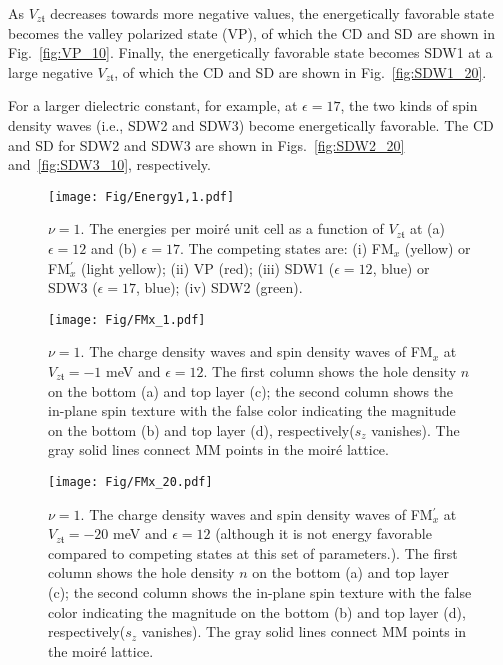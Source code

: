\documentclass[aps,prl,onecolumn,superscriptaddress,longbibliography]{revtex4-2}
\begin{document}

As $V_{z\mathfrak{t}}$ decreases towards more negative values, the energetically favorable state becomes the valley polarized state (VP), of which the CD and SD are shown in Fig.~\ref{fig:VP_10}. Finally, the energetically favorable state becomes SDW1  at a large negative $V_{z\mathfrak{t}}$, of which the CD and SD are shown in Fig.~\ref{fig:SDW1_20}. 

For a larger dielectric constant, for example, at $\epsilon=17$, the two kinds of spin density waves (i.e., SDW2 and SDW3) become energetically favorable. The CD and SD for SDW2 and SDW3 are shown in Figs.~\ref{fig:SDW2_20} and~\ref{fig:SDW3_10}, respectively.


\begin{figure}[ht]
    \centering
    \texttt{[image: Fig/Energy1,1.pdf]}
    \caption{$\nu=1$. The energies per moir\'e unit cell as a function of $V_{z\mathfrak{t}}$ at  (a) $\epsilon=12$ and (b) $\epsilon=17$. The competing states are: (i) FM$_x$ (yellow) or {FM$_x^\prime$ (light yellow)}; (ii) VP (red); (iii) SDW1 ($\epsilon=12$, blue) or SDW3 ($\epsilon=17$, blue); (iv) SDW2 (green).}
    \label{fig:Energy11}
\end{figure}

\begin{figure}[ht]
    \centering
    \texttt{[image: Fig/FMx\_1.pdf]}
    \caption{$\nu=1$. The charge density waves and spin density waves of FM$_x$ at $V_{z\mathfrak{t}}=-1$ meV and $\epsilon=12$. The first column shows the hole density $n$ on the bottom (a) and top layer (c); the second column shows the in-plane spin texture with the false color indicating the magnitude on the bottom (b) and top layer (d), respectively($s_z$ vanishes). The gray solid lines connect MM points in the moir\'e lattice.}
    \label{fig:FMx_1}
\end{figure}

\begin{figure}[ht]
    \centering
    \texttt{[image: Fig/FMx\_20.pdf]}
    \caption{$\nu=1$. The charge density waves and spin density waves of FM$_x^\prime$ at $V_{z\mathfrak{t}}=-20$ meV and $\epsilon=12$ (although it is not energy favorable compared to competing states at this set of parameters.). The first column shows the hole density $n$ on the bottom (a) and top layer (c); the second column shows the in-plane spin texture with the false color indicating the magnitude on the bottom (b) and top layer (d), respectively($s_z$ vanishes). The gray solid lines connect MM points in the moir\'e lattice.}
    \label{fig:FMx_20}
\end{figure}
\end{document}
